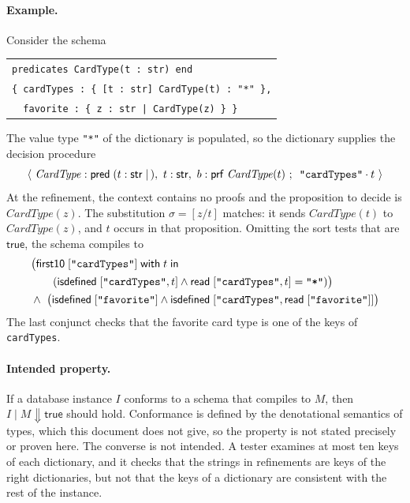 \documentclass[11pt]{article}
\newcommand{\kw}[1]{\mathsf{#1}}
\newcommand{\str}{\kw{str}}
\newcommand{\prf}[1]{\kw{prf}\;#1}
\newcommand{\pred}[1]{\kw{pred}\;#1}
\newcommand{\true}{\kw{true}}
\newcommand{\isdef}[1]{\kw{isdefined}\;#1}
\newcommand{\readm}[1]{\kw{read}\;#1}
\newcommand{\firstten}[3]{\kw{first10}\;#1\;\kw{with}\;#2\;\kw{in}\;#3}
\newcommand{\dproc}[2]{\langle #1;\, #2 \rangle}
\newcommand{\code}[1]{\texttt{#1}}
\theoremstyle{remark}
\begin{document}
\paragraph{Example.} Consider the schema
\begin{center}
\begin{tabular}{l}
\code{predicates CardType(t :\ str) end} \\
\code{\{ cardTypes :\ \{ [t :\ str] CardType(t) :\ "*" \},} \\
\code{\ \ favorite :\ \{ z :\ str | CardType(z) \} \}}
\end{tabular}
\end{center}
The value type \code{"*"} of the dictionary is populated, so the dictionary supplies the decision
procedure
\[ \dproc{\ \mathit{CardType} : \pred{(t : \str \mid\,)},\ t : \str,\ b : \prf{\mathit{CardType}(t)}\ }
         {\ \text{\code{"cardTypes"}} \cdot t\ } \]
At the refinement, the context contains no proofs and the proposition to decide is
$\mathit{CardType}(z)$. The substitution $\sigma = [z/t]$ matches: it sends $\mathit{CardType}(t)$
to $\mathit{CardType}(z)$, and $t$ occurs in that proposition. Omitting the sort tests that are
$\true$, the schema compiles to
\begin{align*}
& \big(\firstten{[\text{\code{"cardTypes"}}]}{t}{} \\
& \qquad (\isdef{[\text{\code{"cardTypes"}}, t]} \wedge
          \readm{[\text{\code{"cardTypes"}}, t]} = \text{\code{"*"}})\big) \\
& \wedge\ \big(\isdef{[\text{\code{"favorite"}}]} \wedge
          \isdef{[\text{\code{"cardTypes"}}, \readm{[\text{\code{"favorite"}}]}]}\big)
\end{align*}
The last conjunct checks that the favorite card type is one of the keys of \code{cardTypes}.

\paragraph{Intended property.} If a database instance $I$ conforms to a schema that compiles to
$M$, then $I \mid M \Downarrow \true$ should hold. Conformance is defined by the denotational
semantics of types, which this document does not give, so the property is not stated precisely or
proven here. The converse is not intended. A tester examines at most ten keys of each dictionary,
and it checks that the strings in refinements are keys of the right dictionaries, but not that the
keys of a dictionary are consistent with the rest of the instance.
\end{document}
